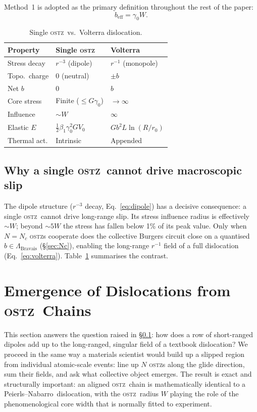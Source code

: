 \documentclass[5p,sort&compress]{elsarticle}
\newcommand{\OSTZ}{\textsc{ostz}}
\newcommand{\gz}{\gamma_0}
\newcommand{\beff}{b_\mathrm{eff}}
\newcommand{\PN}{Peierls--Nabarro}
\newcommand{\half}{\tfrac{1}{2}}
\begin{document}
Method~1 is adopted as the primary definition throughout the rest of
the paper:
\begin{equation}
  \boxed{\beff=\gz W.}
  \label{eq:beff}
\end{equation}

\begin{table}[htbp]
\centering
\small
\caption{Single \OSTZ\ vs.\ Volterra dislocation.}
\label{tab:compare1}
\begin{tabular}{p{1.6cm}p{2.3cm}p{2.3cm}}
\toprule
Property & Single \OSTZ & Volterra\\
\midrule
Stress decay & $r^{-3}$ (dipole) & $r^{-1}$ (monopole)\\
Topo.\ charge & 0 (neutral) & $\pm b$\\
Net $b$ & 0 & $b$\\
Core stress & Finite ($\le G\gz$) & $\to\infty$\\
Influence & $\sim W$ & $\infty$\\
Elastic $E$ & $\half\beta_1\gz^2GV_0$ & $Gb^2L\ln(R/r_0)$\\
Thermal act. & Intrinsic & Appended\\
\bottomrule
\end{tabular}
\end{table}

\subsection{Why a single \OSTZ\ cannot drive macroscopic slip}
\label{sec:nomacroslip}

The dipole structure ($r^{-3}$ decay, Eq.~\eqref{eq:dipole}) has a
decisive consequence: a single \OSTZ\ cannot drive long-range slip.
Its stress influence radius is effectively $\sim W$; beyond $\sim5W$
the stress has fallen below 1\% of its peak value. Only when
$N=N_c$ \OSTZ s cooperate does the collective Burgers circuit close
on a quantised $b\in\Lambda_\mathrm{Bravais}$
(\S\ref{sec:Nc}), enabling the long-range $r^{-1}$ field of a full
dislocation (Eq.~\eqref{eq:volterra}). Table~\ref{tab:compare1}
summarises the contrast.

\section{Emergence of Dislocations from \OSTZ\ Chains}
\label{sec:emergence}

This section answers the question raised in
\S\ref{sec:nomacroslip}: how does a row of short-ranged dipoles add
up to the long-ranged, singular field of a textbook dislocation? We
proceed in the same way a materials scientist would build up a
slipped region from individual atomic-scale events: line up $N$
\OSTZ s along the glide direction, sum their fields, and ask what
collective object emerges. The result is exact and structurally
important: an aligned \OSTZ\ chain is mathematically identical to a
\PN\ dislocation, with the \OSTZ\ radius $W$ playing the role of the
phenomenological core width that is normally fitted to experiment.
\end{document}
